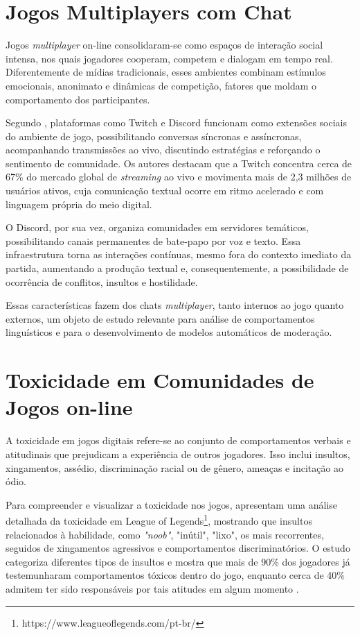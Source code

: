 \documentclass{eic-bcc-tcc}
\begin{document}
\section{Jogos Multiplayers com Chat}

Jogos \textit{multiplayer}  on-line  consolidaram-se como espaços de interação social intensa, nos quais jogadores cooperam, competem e dialogam em tempo real. Diferentemente de mídias tradicionais, esses ambientes combinam estímulos emocionais, anonimato e dinâmicas de competição, fatores que moldam o comportamento dos participantes.

Segundo \cite{sbgames}, plataformas como Twitch e Discord funcionam como extensões sociais do ambiente de jogo, possibilitando conversas síncronas e assíncronas, acompanhando transmissões ao vivo, discutindo estratégias e reforçando o sentimento de comunidade. Os autores destacam que a Twitch concentra cerca de 67\% do mercado global de \textit{streaming} ao vivo e movimenta mais de 2,3 milhões de usuários ativos, cuja comunicação textual ocorre em ritmo acelerado e com linguagem própria do meio digital. 

O Discord, por sua vez, organiza comunidades em servidores temáticos, possibilitando canais permanentes de bate-papo por voz e texto. Essa infraestrutura torna as interações contínuas, mesmo fora do contexto imediato da partida, aumentando a produção textual e, consequentemente, a possibilidade de ocorrência de conflitos, insultos e hostilidade.

Essas características fazem dos chats \textit{multiplayer}, tanto internos ao jogo quanto externos, um objeto de estudo relevante para análise de comportamentos linguísticos e para o desenvolvimento de modelos automáticos de moderação.

\section{Toxicidade em Comunidades de Jogos  on-line }

A toxicidade em jogos digitais refere-se ao conjunto de comportamentos verbais e atitudinais que prejudicam a experiência de outros jogadores. Isso inclui insultos, xingamentos, assédio, discriminação racial ou de gênero, ameaças e incitação ao ódio.

Para compreender e visualizar a toxicidade nos jogos, \cite{assali2024comportamento} apresentam uma análise detalhada da toxicidade em League of Legends\footnote{https://www.leagueoflegends.com/pt-br/}, mostrando que insultos relacionados à habilidade, como \textit{"noob"}, "inútil", "lixo", os mais recorrentes, seguidos de xingamentos agressivos e comportamentos discriminatórios. O estudo categoriza diferentes tipos de insultos e mostra que mais de 90\% dos jogadores já testemunharam comportamentos tóxicos dentro do jogo, enquanto cerca de 40\% admitem ter sido responsáveis por tais atitudes em algum momento .
\end{document}
